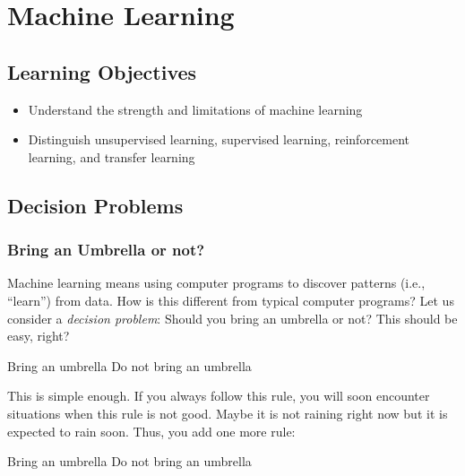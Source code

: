 \newcommand{\learnpath}{\thischapterpath}

\chapter{Machine Learning}



\section{Learning Objectives}


\begin{itemize}
\item Understand the strength and limitations of machine learning
\item Distinguish  unsupervised learning,  supervised learning,  reinforcement learning, and transfer
  learning
\end{itemize}

\section{Decision Problems}



\subsection{Bring an Umbrella or not?}

Machine learning means using computer programs to discover patterns
(i.e., ``learn'') from data. How is this different from typical
computer programs?  Let us consider a {\it decision problem}:
Should you bring an umbrella or not?  This should be easy, right?

\begin{algorithm}
    \begin{algorithmic}[1]
      \State Bring an umbrella
      \Else
      \State Do not bring an umbrella
      \EndIf
    \end{algorithmic}
\end{algorithm}

This is simple enough.  If you always follow this rule, you will soon
encounter situations when this rule is not good.  Maybe it is not raining
right now but it is expected to rain soon. Thus, you add one more rule:

\begin{algorithm}
    \begin{algorithmic}[1]
      \State Bring an umbrella
      \Else
      \State Do not bring an umbrella
      \EndIf
    \end{algorithmic}
\end{algorithm}

